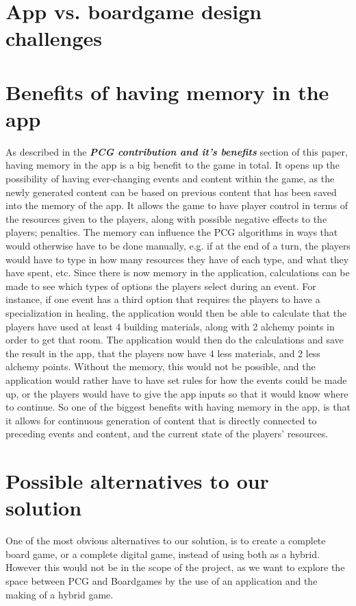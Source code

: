 \section{App vs. boardgame design challenges}
\section{Benefits of having memory in the app}
As described in the \textit{\textbf{PCG contribution and it's benefits}} section of this paper, having memory in the app is a big benefit to the game in total.
It opens up the possibility of having ever-changing events and content within the game, as the newly generated content can be based on previous content that has been saved into the memory of the app.
It allows the game to have player control in terms of the resources given to the players, along with possible negative effects to the players; penalties. The memory can influence the PCG algorithms in ways that would otherwise have to be done manually, e.g. if at the end of a turn, the players would have to type in how many resources they have of each type, and what they have spent, etc.
Since there is now memory in the application, calculations can be made to see which types of options the players select during an event. For instance, if one event has a third option that requires the players to have a specialization in healing, the application would then be able to calculate that the players have used at least 4 building materials, along with 2 alchemy points in order to get that room. The application would then do the calculations and save the result in the app, that the players now have 4 less materials, and 2 less alchemy points. Without the memory, this would not be possible, and the application would rather have to have set rules for how the events could be made up, or the players would have to give the app inputs so that it would know where to continue.
So one of the biggest benefits with having memory in the app, is that it allows for continuous generation of content that is directly connected to preceding events and content, and the current state of the players' resources.

\section{Possible alternatives to our solution}
One of the most obvious alternatives to our solution, is to create a complete board game, or a complete digital game, instead of using both as a hybrid. However this would not be in the scope of the project, as we want to explore the space between PCG and Boardgames by the use of an application and the making of a hybrid game.


